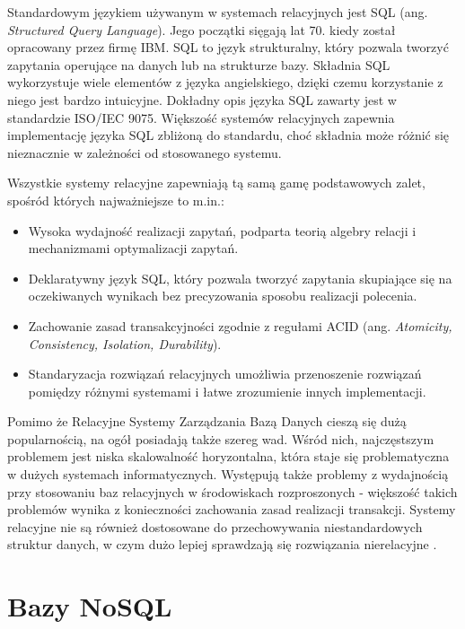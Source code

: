 \documentclass[a4paper,twoside,12pt]{book}
\newcommand{\obcy}[1]{\emph{#1}}
\newcommand{\ang}[1]{{\selectlanguage{british}\obcy{#1}}}
\begin{document}
Standardowym językiem używanym w systemach relacyjnych jest SQL (ang. \ang{Structured Query Language}). Jego początki sięgają lat 70. kiedy został opracowany przez firmę IBM. SQL to język strukturalny, który pozwala tworzyć zapytania operujące na danych lub na strukturze bazy. Składnia SQL wykorzystuje wiele elementów z języka angielskiego, dzięki czemu korzystanie z niego jest bardzo intuicyjne. Dokładny opis języka SQL zawarty jest w standardzie ISO/IEC 9075. Większość systemów relacyjnych zapewnia implementację języka SQL zbliżoną do standardu, choć składnia może różnić się nieznacznie w zależności od stosowanego systemu.

Wszystkie systemy relacyjne zapewniają tą samą gamę podstawowych zalet, spośród których najważniejsze to m.in.:

\begin{itemize}
\item Wysoka wydajność realizacji zapytań, podparta teorią algebry relacji i mechanizmami optymalizacji zapytań.
\item Deklaratywny język SQL, który pozwala tworzyć zapytania skupiające się na oczekiwanych wynikach bez precyzowania sposobu realizacji polecenia.
\item Zachowanie zasad transakcyjności zgodnie z regułami ACID (ang. \ang{Atomicity, Consistency, Isolation, Durability}).
\item Standaryzacja rozwiązań relacyjnych umożliwia przenoszenie rozwiązań pomiędzy różnymi systemami i łatwe zrozumienie innych implementacji.
\end{itemize}

Pomimo że Relacyjne Systemy Zarządzania Bazą Danych cieszą się dużą popularnością, na ogół posiadają także szereg wad. Wśród nich, najczęstszym problemem jest niska skalowalność horyzontalna, która staje się problematyczna w dużych systemach informatycznych. Występują także problemy z wydajnością przy stosowaniu baz relacyjnych w środowiskach rozproszonych - większość takich problemów wynika z konieczności zachowania zasad realizacji transakcji. Systemy relacyjne nie są również dostosowane do przechowywania niestandardowych struktur danych, w czym dużo lepiej sprawdzają się rozwiązania nierelacyjne \cite{bib:whats-better-for-your-big-data-application-sql-or-nosql}.

\section{Bazy NoSQL}
\end{document}

